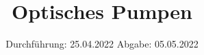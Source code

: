 

\subject{Versuch Nr.21}
\title{Optisches Pumpen}
\date{%
  Durchführung: 25.04.2022
  \hspace{3em}
  Abgabe: 05.05.2022
}



\maketitle
\thispagestyle{empty}
\tableofcontents
\newpage 








\nocite{*}

\printbibliography{}


